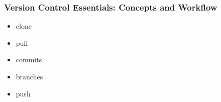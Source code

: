 \documentclass[tikz]{beamer}
\begin{document}



















\begin{frame}
  \frametitle{Version Control Essentials: Concepts and Workflow}
    \begin{itemize}
    \item clone
    \item pull 
    \item commits
    \item branches
    \item push
    \end{itemize}
\end{frame}
\end{document}
